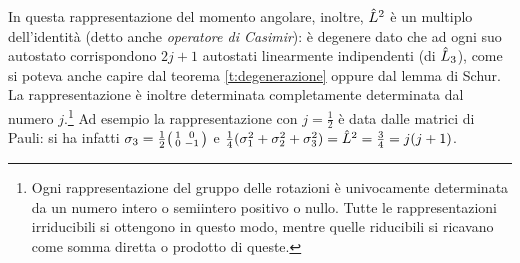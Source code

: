 In questa rappresentazione del momento angolare, inoltre, $\hat{L}^2$ è un multiplo dell'identità (detto anche \emph{operatore di Casimir}): è degenere dato che ad ogni suo autostato corrispondono $2j+1$ autostati linearmente indipendenti (di $\hat{L}_3$), come si poteva anche capire dal teorema \ref{t:degenerazione} oppure dal lemma di Schur.
La rappresentazione è inoltre determinata completamente determinata dal numero $j$.\footnote{Ogni rappresentazione del gruppo delle rotazioni è univocamente determinata da un numero intero o semiintero positivo o nullo. Tutte le rappresentazioni irriducibili si ottengono in questo modo, mentre quelle riducibili si ricavano come somma diretta o prodotto di queste.}
Ad esempio la rappresentazione con $j=\frac12$ è data dalle matrici di Pauli: si ha infatti $\sigma_3=\frac12\begin{psmallmatrix}1&0\\0&-1\end{psmallmatrix}$ e $\frac14(\sigma_1^2+\sigma_2^2+\sigma_3^2)=\hat{L}^2=\frac34=j(j+1)$.

